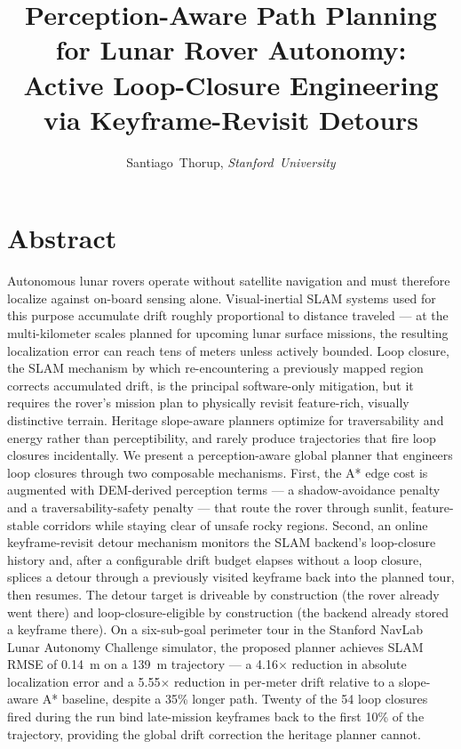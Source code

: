 \documentclass[letterpaper,times]{IONconf}
\title{Perception-Aware Path Planning for Lunar Rover Autonomy: \\
Active Loop-Closure Engineering via Keyframe-Revisit Detours}
\author{
    Santiago~Thorup, \textit{Stanford~University}%
    }
\begin{document}
\maketitle


\section*{Abstract}

Autonomous lunar rovers operate without satellite navigation and must therefore localize against on-board sensing alone. Visual-inertial SLAM systems used for this purpose accumulate drift roughly proportional to distance traveled --- at the multi-kilometer scales planned for upcoming lunar surface missions, the resulting localization error can reach tens of meters unless actively bounded. Loop closure, the SLAM mechanism by which re-encountering a previously mapped region corrects accumulated drift, is the principal software-only mitigation, but it requires the rover's mission plan to physically revisit feature-rich, visually distinctive terrain. Heritage slope-aware planners optimize for traversability and energy rather than perceptibility, and rarely produce trajectories that fire loop closures incidentally. We present a perception-aware global planner that engineers loop closures through two composable mechanisms. First, the A* edge cost is augmented with DEM-derived perception terms --- a shadow-avoidance penalty and a traversability-safety penalty --- that route the rover through sunlit, feature-stable corridors while staying clear of unsafe rocky regions. Second, an online keyframe-revisit detour mechanism monitors the SLAM backend's loop-closure history and, after a configurable drift budget elapses without a loop closure, splices a detour through a previously visited keyframe back into the planned tour, then resumes. The detour target is driveable by construction (the rover already went there) and loop-closure-eligible by construction (the backend already stored a keyframe there). On a six-sub-goal perimeter tour in the Stanford NavLab Lunar Autonomy Challenge simulator, the proposed planner achieves SLAM RMSE of 0.14~m on a 139~m trajectory --- a 4.16$\times$ reduction in absolute localization error and a 5.55$\times$ reduction in per-meter drift relative to a slope-aware A* baseline, despite a 35\% longer path. Twenty of the 54 loop closures fired during the run bind late-mission keyframes back to the first 10\% of the trajectory, providing the global drift correction the heritage planner cannot.
\end{document}
